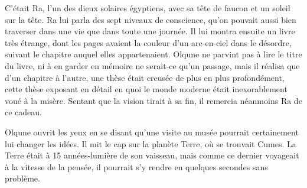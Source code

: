 \documentclass[a4paper,11pt, openany]{book}
\begin{document}
C'était Ra, l'un des dieux solaires égyptiens, avec sa tête de faucon et un soleil sur la tête. Ra lui parla des sept niveaux de conscience, qu'on pouvait aussi bien traverser dans une vie que dans toute une journée.
Il lui montra ensuite un livre très étrange, dont les pages avaient la couleur d'un arc-en-ciel dans le désordre, suivant le chapitre auquel elles appartenaient. Olqune ne parvint pas à lire le titre du livre, ni à en garder en mémoire ne serait-ce qu'un passage,
mais il réalisa que d'un chapitre à l'autre, une thèse était creusée de plus en plus profondément, cette thèse exposant en détail en quoi le monde moderne était inexorablement voué à la misère. 
Sentant que la vision tirait à sa fin, il remercia néanmoins Ra de ce cadeau.

Olqune ouvrit les yeux en se disant qu'une visite au musée pourrait certainement lui changer les idées. Il mit le cap sur la planète Terre, où se trouvait Cumes. La Terre était à 15 années-lumière de son vaisseau, mais comme 
ce dernier voyageait à la vitesse de la pensée, il pourrait s'y rendre en quelques secondes sans problème. 
\end{document}

